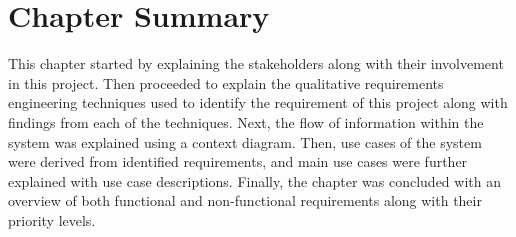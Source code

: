 \section{Chapter Summary}
This chapter started by explaining the stakeholders along with their involvement in this project. Then proceeded to explain the qualitative requirements engineering techniques used to identify the requirement of this project along with findings from each of the techniques. Next, the flow of information within the system was explained using a context diagram. Then, use cases of the system were derived from identified requirements, and main use cases were further explained with use case descriptions. Finally, the chapter was concluded with an overview of both functional and non-functional requirements along with their priority levels.